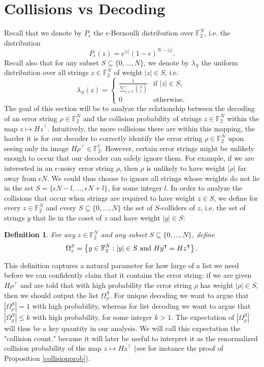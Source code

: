 \documentclass[12pt]{article}
\newtheorem{definition}{Definition}
\begin{document}
\section{Collisions vs Decoding}\label{collisionsdecoding}
Recall that we denote by $P_\epsilon$ the $\epsilon$-Bernoulli distribution over $\mathbb{F}_2^N$, i.e. the distribution
$$P_\epsilon (z)=\epsilon^{|z|}(1-\epsilon)^{N-|z|}.$$
Recall also that for any subset $S\subseteq \{0,...,N\}$, we denote by $\lambda_{S}$ the uniform distribution over all strings $z\in\mathbb{F}_2^N$ of weight $|z|\in S$, i.e.
$$\lambda_{S}(z)=\begin{cases}
\frac{1}{\sum_{j\in S} \binom{N}{j}} & \text{if $|z|\in S$,}\\
0 & \text{otherwise.}
\end{cases}$$
The goal of this section will be to analyze the relationship between the decoding of an error string $\rho\in\mathbb{F}_2^N$ and the collision probability of strings $z\in\mathbb{F}_2^N$ within the map $z\mapsto Hz^\intercal$. Intuitively, the more collisions there are within this mapping, the harder it is for our decoder to correctly identify the error string $\rho\in\mathbb{F}_2^N$ upon seeing only its image $H\rho^\intercal\in\mathbb{F}_2^t$. However, certain error strings might be unlikely enough to occur that our decoder can safely ignore them. For example, if we are interested in an $\epsilon$-noisy error string $\rho$, then $\rho$ is unlikely to have weight $|\rho|$ far away from $\epsilon N$. We could thus choose to ignore all strings whose weights do not lie in the set $S=\{\epsilon N-l,...,\epsilon N+l\}$, for some integer $l$. In order to analyze the collisions that occur when strings are required to have weight $z\in S$, we define for every $z\in\mathbb{F}_2^N$ and every $S\subseteq \{0,...,N\}$ the set of $S$-colliders of $z$, i.e. the set of strings $y$ that lie in the coset of $z$ and have weight $|y|\in S$:
\begin{definition}
For any $z\in\mathbb{F}_2^N$ and any subset $S\subseteq\{0,...,N\}$, define 
$$\Omega_z^S=\left\{y\in \mathbb{F}_2^N :|y|\in S\textnormal{ and } Hy^{\intercal}=Hz^\intercal   \right\}.$$
\end{definition}
This definition captures a natural parameter for how large of a list we need before we can confidently claim that it contains the error string: if we are given $H\rho^\intercal$ and are told that with high probability the error string $\rho$ has weight $|\rho|\in S$, then we should output the list $\Omega_\rho^S$. For unique decoding we want to argue that $|\Omega_\rho^S|=1$ with high probability, whereas for list decoding we want to argue that $|\Omega_\rho^S|\leq k$ with high probability, for some integer $k>1$. The expectation of $|\Omega_\rho^S|$ will thus be a key quantity in our analysis. We will call this expectation the "collision count," because it will later be useful to interpret it as the renormalized collision probability of the map $z\mapsto Hz^\intercal$ (see for instance the proof of Proposition \ref{collisionprob}).
\end{document}
